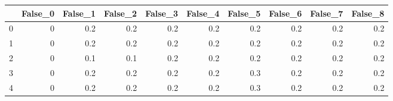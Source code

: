 \begin{tabular}{lrrrrrrrrr}
\toprule
{} &  False\_0 &  False\_1 &  False\_2 &  False\_3 &  False\_4 &  False\_5 &  False\_6 &  False\_7 &  False\_8 \\ \hline
\midrule
0 &        0 &      0.2 &      0.2 &      0.2 &      0.2 &      0.2 &      0.2 &      0.2 &      0.2 \\ \hline
1 &        0 &      0.2 &      0.2 &      0.2 &      0.2 &      0.2 &      0.2 &      0.2 &      0.2 \\ \hline
2 &        0 &      0.1 &      0.1 &      0.2 &      0.2 &      0.2 &      0.2 &      0.2 &      0.2 \\ \hline
3 &        0 &      0.2 &      0.2 &      0.2 &      0.2 &      0.3 &      0.2 &      0.2 &      0.2 \\ \hline
4 &        0 &      0.2 &      0.2 &      0.2 &      0.2 &      0.3 &      0.2 &      0.2 &      0.2 \\ \hline
\bottomrule
\end{tabular}
